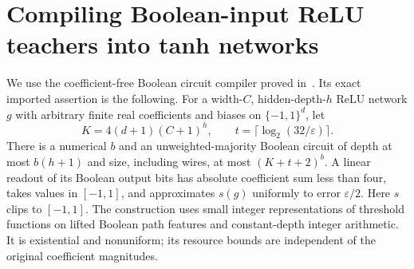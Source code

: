 \section{Compiling Boolean-input ReLU teachers into tanh networks}
\label{sec:tanh-compiler}
We use the coefficient-free Boolean circuit compiler proved in~\cite{boolean}. Its exact imported assertion is the following. For a width-$C$, hidden-depth-$h$ ReLU network $g$ with arbitrary finite real coefficients and biases on $\{-1,1\}^d$, let
\[
 K=4(d+1)(C+1)^h,\qquad t=\lceil\log_2(32/\varepsilon)\rceil.
\]
There is a numerical $b$ and an unweighted-majority Boolean circuit of depth at most $b(h+1)$ and size, including wires, at most $(K+t+2)^b$. A linear readout of its Boolean output bits has absolute coefficient sum less than four, takes values in $[-1,1]$, and approximates $s(g)$ uniformly to error $\varepsilon/2$. Here $s$ clips to $[-1,1]$. The construction uses small integer representations of threshold functions on lifted Boolean path features and constant-depth integer arithmetic. It is existential and nonuniform; its resource bounds are independent of the original coefficient magnitudes.


